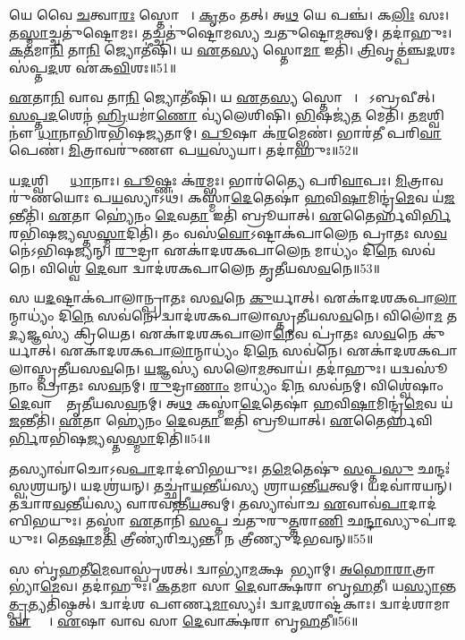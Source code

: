 𑌯𑍇 𑌵𑍈 \ul{𑌚}𑌤𑍍𑌵𑌾\ul{𑌰𑌃} 𑌸𑍍𑌤𑍋𑌮𑌾𑌃᳚।
\ul{𑌕𑍃}𑌤𑌂 𑌤𑌤𑍍।
𑌅\ul{𑌥} 𑌯𑍇 𑌪𑌞𑍍𑌚॑।
𑌕\ul{𑌲𑌿𑌃} 𑌸𑌃।
𑌤\ul{𑌸𑍍𑌮𑌾}𑌚𑍍𑌚𑌤𑍁॑𑌷𑍍𑌟𑍋𑌮𑌃।
𑌤𑌚𑍍𑌚𑌤𑍁॑𑌷𑍍𑌟𑍋𑌮𑌸𑍍𑌯 𑌚𑌤𑍁𑌷𑍍𑌟𑍋\ul{𑌮}𑌤𑍍𑌵𑌮𑍍।
𑌤𑌦𑌾॑𑌹𑍁𑌃।
\ul{𑌕}\ul{𑌤}𑌮𑌾\ul{𑌨𑌿} 𑌤𑌾\ul{𑌨𑌿} 𑌜𑍍𑌯𑍋𑌤𑍀॑𑌷𑌿।
𑌯 \ul{𑌏}𑌤\ul{𑌸𑍍𑌯} 𑌸𑍍𑌤𑍋\ul{𑌮𑌾} 𑌇𑌤𑌿॑।
\ul{𑌤𑍍𑌰𑌿}𑌵𑍃𑌤𑍍𑌪॑𑌞𑍍𑌚\ul{𑌦}𑌶𑌃 𑌸॑𑌪𑍍𑌤\ul{𑌦}𑌶 𑌏॑𑌕\ul{𑌵𑌿}\ul{}𑌶𑌃॥51॥

\ul{𑌏}𑌤𑌾\ul{𑌨𑌿} 𑌵𑌾𑌵 𑌤𑌾\ul{𑌨𑌿} 𑌜𑍍𑌯𑍋𑌤𑍀॑𑌷𑌿।
𑌯 \ul{𑌏}𑌤\ul{𑌸𑍍𑌯} 𑌸𑍍𑌤𑍋𑌮𑌾𑌃᳚।
𑌸𑍋᳚𑌽𑌬𑍍𑌰𑌵𑍀𑌤𑍍।
\ul{𑌸}\ul{𑌪𑍍𑌤}\ul{𑌦}𑌶𑍇𑌨॑ \ul{𑌹𑍍𑌰𑌿}𑌯𑌮𑌾॑\ul{𑌣𑍋} 𑌵𑍍𑌯॑𑌲𑍇𑌶𑌿𑌷𑌿।
\ul{𑌭𑌿}𑌷𑌜𑍍𑌯॑\ul{𑌤} 𑌮𑍇𑌤𑌿॑।
𑌤\ul{𑌮}𑌶𑍍𑌵𑌿𑌨𑍗॑ \ul{𑌧𑌾}𑌨𑌾𑌭𑌿॑𑌰𑌭𑌿𑌷𑌜𑍍𑌯𑌤𑌾𑌮𑍍।
\ul{𑌪𑍂}𑌷𑌾 𑌕॑\ul{𑌰}𑌮𑍍𑌭𑍇𑌣॑।
𑌭𑌾𑌰॑𑌤𑍀 𑌪𑌰𑌿\ul{𑌵𑌾}𑌪𑍇𑌣॑।
\ul{𑌮𑌿}𑌤𑍍𑌰𑌾𑌵𑌰𑍁॑𑌣𑍗 𑌪\ul{𑌯}𑌸𑍍𑌯॑𑌯𑌾।
𑌤𑌦𑌾॑𑌹𑍁𑌃॥52॥

𑌯\ul{𑌦}𑌶𑍍𑌵𑌿𑌭𑍍𑌯𑌾𑌂᳚ \ul{𑌧𑌾}𑌨𑌾𑌃।
\ul{𑌪𑍂}𑌷𑍍𑌣𑌃 𑌕॑\ul{𑌰}𑌮𑍍𑌭𑌃।
𑌭𑌾𑌰॑𑌤𑍍𑌯𑍈 𑌪𑌰𑌿\ul{𑌵𑌾}𑌪𑌃।
\ul{𑌮𑌿}𑌤𑍍𑌰𑌾𑌵𑌰𑍁॑𑌣𑌯𑍋𑌃 𑌪\ul{𑌯}𑌸𑍍𑌯𑌾𑌽𑌥॑।
𑌕𑌸𑍍𑌮𑌾॑\ul{𑌦𑍇}𑌤𑍇𑌷𑌾॑ \ul{𑌹}𑌵𑌿\ul{𑌷𑌾}𑌮𑌿𑌨𑍍𑌦𑍍𑌰॑\ul{𑌮𑍇}𑌵 𑌯॑\ul{𑌜}𑌨𑍍𑌤𑍀𑌤𑌿॑।
\ul{𑌏}𑌤𑌾 𑌹𑍍𑌯𑍇॑𑌨𑌂 \ul{𑌦𑍇}𑌵\ul{𑌤𑌾} 𑌇𑌤𑌿॑ 𑌬𑍍𑌰𑍂𑌯𑌾𑌤𑍍।
\ul{𑌏}𑌤𑍈𑌰𑍍\mbox{}\ul{𑌹}𑌵𑌿\ul{𑌰𑍍𑌭𑌿}\-𑌰𑌭𑌿॑𑌷\ul{𑌜𑍍𑌯}\ul{}𑌸𑍍𑌤\ul{𑌸𑍍𑌮𑌾}𑌦𑌿𑌤𑌿॑।
𑌤𑌂 𑌵𑌸॑\ul{𑌵𑍋}\-𑌽𑌷𑍍𑌟𑌾𑌕॑𑌪𑌾𑌲𑍇𑌨 𑌪𑍍𑌰𑌾𑌤𑌃 𑌸\ul{𑌵}𑌨𑍇॑\-𑌽𑌭𑌿𑌷𑌜𑍍𑌯𑌨𑍍।
\ul{𑌰𑍁}𑌦𑍍𑌰𑌾 𑌏𑌕𑌾॑𑌦𑌶𑌕𑌪𑌾𑌲𑍇\ul{𑌨} 𑌮𑌾𑌧𑍍𑌯𑌂॑ 𑌦𑌿\ul{𑌨𑍇} 𑌸𑌵॑𑌨𑍇।
𑌵𑌿𑌶𑍍𑌵𑍇॑ \ul{𑌦𑍇}𑌵𑌾 𑌦𑍍𑌵𑌾𑌦॑𑌶𑌕𑌪𑌾𑌲𑍇𑌨 𑌤𑍃𑌤𑍀𑌯𑌸\ul{𑌵}𑌨𑍇॥53॥

𑌸 𑌯\ul{𑌦}𑌷𑍍𑌟𑌾𑌕॑𑌪𑌾𑌲𑌾𑌨𑍍𑌪𑍍𑌰𑌾𑌤𑌃 𑌸\ul{𑌵}𑌨𑍇 \ul{𑌕𑍁}𑌰𑍍𑌯𑌾𑌤𑍍।
𑌏𑌕𑌾॑𑌦𑌶\-𑌕𑌪𑌾\ul{𑌲𑌾}𑌨𑍍𑌮𑌾𑌧𑍍𑌯𑌂॑ 𑌦𑌿\ul{𑌨𑍇} 𑌸𑌵॑𑌨𑍇।
𑌦𑍍𑌵𑌾𑌦॑𑌶\-𑌕𑌪𑌾𑌲𑌾𑌸𑍍𑌤𑍃𑌤𑍀𑌯𑌸\ul{𑌵}𑌨𑍇।
𑌵𑌿𑌲𑍋॑\ul{𑌮} 𑌤\ul{𑌦𑍍𑌯}𑌜𑍍𑌞𑌸𑍍𑌯॑ 𑌕𑍍𑌰𑌿𑌯𑍇𑌤।
𑌏𑌕𑌾॑𑌦𑌶\-𑌕𑌪𑌾𑌲𑌾\ul{𑌨𑍇}𑌵 𑌪𑍍𑌰𑌾॑𑌤𑌃 𑌸\ul{𑌵}𑌨𑍇 𑌕𑍁॑𑌰𑍍𑌯𑌾𑌤𑍍।
𑌏𑌕𑌾॑𑌦𑌶\-𑌕𑌪𑌾\ul{𑌲𑌾}𑌨𑍍𑌮𑌾𑌧𑍍𑌯𑌂॑ 𑌦𑌿\ul{𑌨𑍇} 𑌸𑌵॑𑌨𑍇।
𑌏𑌕𑌾॑𑌦𑌶\-𑌕𑌪𑌾𑌲𑌾\-𑌸𑍍𑌤𑍃𑌤𑍀𑌯𑌸\ul{𑌵}𑌨𑍇।
\ul{𑌯}𑌜𑍍𑌞𑌸𑍍𑌯॑ 𑌸𑌲𑍋\ul{𑌮}𑌤𑍍𑌵𑌾𑌯॑।
𑌤𑌦𑌾॑𑌹𑍁𑌃।
𑌯𑌦𑍍𑌵𑌸𑍂॑𑌨𑌾𑌂 𑌪𑍍𑌰𑌾𑌤𑌃 𑌸\ul{𑌵}𑌨𑌮𑍍।
\ul{𑌰𑍁}𑌦𑍍𑌰𑌾\ul{𑌣𑌾𑌂} 𑌮𑌾𑌧𑍍𑌯𑌂॑ 𑌦𑌿\ul{𑌨}\ul{} 𑌸𑌵॑𑌨𑌮𑍍।
𑌵𑌿𑌶𑍍𑌵𑍇॑𑌷𑌾𑌂 \ul{𑌦𑍇}𑌵𑌾𑌨𑌾𑌂᳚ 𑌤𑍃𑌤𑍀𑌯𑌸\ul{𑌵}𑌨𑌮𑍍।
𑌅\ul{𑌥} 𑌕𑌸𑍍𑌮𑌾॑\ul{𑌦𑍇}𑌤𑍇𑌷𑌾॑ \ul{𑌹}𑌵𑌿\ul{𑌷𑌾}𑌮𑌿𑌨𑍍𑌦𑍍𑌰॑\ul{𑌮𑍇}𑌵 𑌯॑\ul{𑌜}𑌨𑍍𑌤𑍀𑌤𑌿॑।
\ul{𑌏}𑌤𑌾 𑌹𑍍𑌯𑍇॑𑌨𑌂 \ul{𑌦𑍇}𑌵\ul{𑌤𑌾} 𑌇𑌤𑌿॑ 𑌬𑍍𑌰𑍂𑌯𑌾𑌤𑍍।
\ul{𑌏}𑌤𑍈𑌰𑍍\-\mbox{}\ul{𑌹}𑌵𑌿\ul{𑌰𑍍𑌭𑌿}𑌰𑌭𑌿॑\-𑌷\ul{𑌜𑍍𑌯}\ul{}𑌸𑍍𑌤\ul{𑌸𑍍𑌮𑌾}𑌦𑌿𑌤𑌿॑॥54॥\anuvakamend[\ul{𑌏}\ul{𑌕}\ul{𑌵𑌿}\ul{\dng{ꣳ}}𑌶 𑌆॑𑌹𑍁𑌸𑍍𑌤𑍃𑌤𑍀𑌯𑌸\ul{𑌵}𑌨𑍇 𑌪𑍍𑌰𑌾॑𑌤𑌃 𑌸\ul{𑌵}𑌨𑌂 𑌪𑌞𑍍𑌚॑ 𑌚]

𑌤𑌸𑍍𑌯𑌾𑌵𑌾॑𑌚𑍋\-𑌽𑌵\ul{𑌪𑌾}𑌦𑌾𑌦॑𑌬𑌿𑌭𑌯𑍁𑌃।
𑌤\ul{𑌮𑍇}𑌤𑍇𑌷𑍁॑ \ul{𑌸}𑌪𑍍𑌤\ul{𑌸𑍁} 𑌛𑌨𑍍𑌦𑌃॑ 𑌸𑍍𑌵𑌶𑍍𑌰𑌯𑌨𑍍।
𑌯𑌦𑌶𑍍𑌰॑𑌯𑌨𑍍।
𑌤𑌚𑍍𑌛𑍍𑌰𑌾॑\ul{𑌯}𑌨𑍍𑌤𑍀𑌯॑𑌸𑍍𑌯 𑌶𑍍𑌰𑌾𑌯𑌨𑍍𑌤𑍀\ul{𑌯}𑌤𑍍𑌵𑌮𑍍।
𑌯𑌦𑌵𑌾॑𑌰𑌯𑌨𑍍।
𑌤𑌦𑍍𑌵𑌾॑𑌰\-\ul{𑌵}𑌨𑍍𑌤𑍀𑌯॑𑌸𑍍𑌯 𑌵𑌾𑌰𑌵𑌨𑍍𑌤𑍀\ul{𑌯}𑌤𑍍𑌵𑌮𑍍।
𑌤𑌸𑍍𑌯𑌾𑌵𑌾॑𑌚 \ul{𑌏}𑌵𑌾𑌵॑\ul{𑌪𑌾}𑌦𑌾𑌦॑𑌬𑌿𑌭𑌯𑍁𑌃।
𑌤𑌸𑍍𑌮𑌾॑ \ul{𑌏}𑌤𑌾𑌨𑌿॑ \ul{𑌸}𑌪𑍍𑌤 𑌚॑𑌤𑍁𑌰𑍁\ul{𑌤𑍍𑌤}𑌰𑌾\ul{𑌣𑌿} 𑌛\ul{𑌨𑍍𑌦𑌾}\ul{}𑌸𑍍𑌯𑍁𑌪𑌾॑𑌦𑌧𑍁𑌃।
𑌤𑍇\ul{𑌷𑌾}𑌮\ul{𑌤𑌿} 𑌤𑍍𑌰𑍀𑌣𑍍𑌯॑𑌰𑌿𑌚𑍍𑌯𑌨𑍍𑌤।
𑌨 𑌤𑍍𑌰𑍀𑌣𑍍𑌯𑍁𑌦॑\-𑌭𑌵𑌨𑍍॥55॥

𑌸 𑌬𑍃॑\ul{𑌹}𑌤𑍀\ul{𑌮𑍇}𑌵𑌾𑌸𑍍𑌪𑍃॑𑌶𑌤𑍍।
𑌦𑍍𑌵𑌾𑌭𑍍𑌯𑌾॑\ul{𑌮}𑌕𑍍𑌷𑌰𑌾᳚𑌭𑍍𑌯𑌾𑌮𑍍।
\ul{𑌅}\ul{𑌹𑍋}\ul{𑌰𑌾}𑌤𑍍𑌰𑌾𑌭𑍍𑌯𑌾॑\ul{𑌮𑍇}𑌵।
𑌤𑌦𑌾॑𑌹𑍁𑌃।
\ul{𑌕}\ul{𑌤}𑌮𑌾 𑌸𑌾 \ul{𑌦𑍇}𑌵𑌾𑌕𑍍𑌷॑𑌰𑌾 𑌬𑍃\ul{𑌹}𑌤𑍀।
𑌯\ul{𑌸𑍍𑌯𑌾}𑌨𑍍𑌤\ul{𑌤𑍍𑌪𑍍𑌰}𑌤𑍍𑌯𑌤𑌿॑𑌷𑍍𑌠𑌤𑍍।
𑌦𑍍𑌵𑌾𑌦॑𑌶 𑌪𑍗𑌰𑍍𑌣\ul{𑌮𑌾}𑌸𑍍𑌯𑌃॑।
𑌦𑍍𑌵𑌾\ul{𑌦}𑌶𑌾𑌷𑍍𑌟॑𑌕𑌾𑌃।
𑌦𑍍𑌵𑌾𑌦॑𑌶𑌾𑌮𑌾\ul{𑌵𑌾}𑌸𑍍𑌯𑌾𑌃᳚।
\ul{𑌏}𑌷𑌾 𑌵𑌾𑌵 𑌸𑌾 \ul{𑌦𑍇}𑌵𑌾𑌕𑍍𑌷॑𑌰𑌾 𑌬𑍃\ul{𑌹}𑌤𑍀॥56॥

